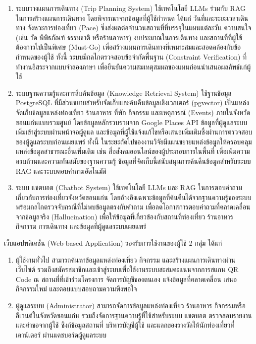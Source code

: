 \begin{enumerate}[label=(\arabic*),leftmargin=0pt,itemindent=\dimexpr\parindent+\parenlabelwidth+1em\relax,align=right,labelwidth=\parenlabelwidth,labelsep=1em]
\item ระบบวางแผนการเดินทาง (Trip Planning System) ใช้เทคโนโลยี LLMs ร่วมกับ RAG ในการสร้างแผนการเดินทาง โดยพิจารณาจากข้อมูลที่ผู้ใช้กำหนด ได้แก่ วันที่และระยะเวลาเดินทาง จังหวะการท่องเที่ยว (Pace) ซึ่งส่งผลต่อจำนวนสถานที่ที่บรรจุในแผนแต่ละวัน ความสนใจ (เช่น วัด พิพิธภัณฑ์ ธรรมชาติ หรือร้านอาหาร) งบประมาณในการเดินทาง และสถานที่ที่ผู้ใช้ต้องการไปเป็นพิเศษ (Must-Go) เพื่อสร้างแผนการเดินทางที่เหมาะสมและสอดคล้องกับข้อกำหนดของผู้ใช้ ทั้งนี้ ระบบมีกลไกตรวจสอบข้อจำกัดพื้นฐาน (Constraint Verification) ที่ทำงานอิสระจากแบบจำลองภาษา เพื่อยืนยันความสมเหตุสมผลของแผนก่อนนำเสนอผลลัพธ์แก่ผู้ใช้
\item ระบบฐานความรู้และการสืบค้นข้อมูล (Knowledge Retrieval System) ใช้ฐานข้อมูล PostgreSQL ที่มีส่วนขยายสำหรับจัดเก็บและค้นคืนข้อมูลเชิงเวกเตอร์ (pgvector) เป็นแหล่งจัดเก็บข้อมูลแหล่งท่องเที่ยว ร้านอาหาร ที่พัก กิจกรรม และเหตุการณ์ (Events) ภายในจังหวัดขอนแก่นแบบรวมศูนย์ โดยข้อมูลหลักรวบรวมจาก Google Places API ข้อมูลที่ผู้ดูแลระบบเพิ่มเข้าสู่ระบบผ่านหน้าจอผู้ดูแล และข้อมูลที่ผู้ใช้แจ้งแก้ไขหรือเสนอเพิ่มเติมซึ่งผ่านการตรวจสอบของผู้ดูแลระบบก่อนเผยแพร่ ทั้งนี้ ในระยะถัดไปของงานวิจัยมีแผนขยายแหล่งข้อมูลให้ครอบคลุมแหล่งข้อมูลสาธารณะอื่นเพิ่มเติม เช่น สื่อสังคมออนไลน์ของผู้ประกอบการในพื้นที่ เพื่อเพิ่มความครบถ้วนและความทันสมัยของฐานความรู้ ข้อมูลที่จัดเก็บนี้สนับสนุนการค้นคืนข้อมูลสำหรับระบบ RAG และระบบตอบคำถามอัตโนมัติ
\item ระบบ แชตบอต (Chatbot System) ใช้เทคโนโลยี LLMs และ RAG ในการตอบคำถามเกี่ยวกับการท่องเที่ยวจังหวัดขอนแก่น โดยอ้างอิงเฉพาะข้อมูลที่ค้นคืนได้จากฐานความรู้ของระบบ พร้อมกลไกตรวจจับกรณีที่ไม่พบข้อมูลตรงกับคำถาม เพื่อลดโอกาสการตอบคำถามที่คลาดเคลื่อนจากข้อมูลจริง (Hallucination) เพื่อให้ข้อมูลที่เกี่ยวข้องกับสถานที่ท่องเที่ยว ร้านอาหาร กิจกรรม การเดินทาง และข้อมูลที่ผู้ดูแลระบบเผยแพร่
\end{enumerate}

เว็บแอปพลิเคชัน (Web-based Application) รองรับการใช้งานของผู้ใช้ 2 กลุ่ม ได้แก่

\begin{enumerate}[label=(\arabic*),leftmargin=0pt,itemindent=\dimexpr\parindent+\parenlabelwidth+1em\relax,align=right,labelwidth=\parenlabelwidth,labelsep=1em]
\item ผู้ใช้งานทั่วไป สามารถค้นหาข้อมูลแหล่งท่องเที่ยว กิจกรรม และสร้างแผนการเดินทางผ่านเว็บไซต์ รวมถึงสมัครสมาชิกและเข้าสู่ระบบเพื่อใช้งานระบบสะสมคะแนนจากการสแกน QR Code ณ สถานที่ที่เข้าร่วมโครงการ จัดการบัญชีของตนเอง แจ้งข้อมูลที่คลาดเคลื่อน เสนอกิจกรรมใหม่ และตอบแบบสอบถามความพึงพอใจ
\item ผู้ดูแลระบบ (Administrator) สามารถจัดการข้อมูลแหล่งท่องเที่ยว ร้านอาหาร กิจกรรมหรืออีเวนต์ในจังหวัดขอนแก่น รวมถึงจัดการฐานความรู้ที่ใช้สำหรับระบบ แชตบอต ตรวจสอบรายงานและคำขอจากผู้ใช้ ซิงก์ข้อมูลสถานที่ บริหารบัญชีผู้ใช้ และแลกของรางวัลให้นักท่องเที่ยวที่เคาน์เตอร์ ผ่านแดชบอร์ดผู้ดูแลระบบ
\end{enumerate}

